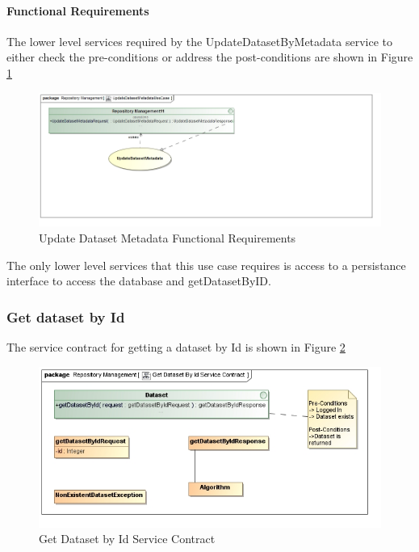 \paragraph{Functional Requirements}
The lower level services required by the UpdateDatasetByMetadata service to either check the
pre-conditions or address the post-conditions are shown in Figure \ref{fig:UpdateDatasetMetadataUseCase}
\begin{figure}[H]
	\begin{center}
		\includegraphics[scale=0.6]{../Diagrams and Charts/Test Data/UpdateDatasetMetadataUseCase.jpg}
		\caption{Update Dataset Metadata Functional Requirements}
		\label{fig:UpdateDatasetMetadataUseCase}
	\end{center}
\end{figure}

The only lower level services that this use case requires is access to
a persistance interface to access the database and getDatasetByID.
\subsubsection {Get dataset by Id}
The service contract for getting a dataset by Id is shown in Figure \ref{fig:getDatasetByIdService}
\begin{figure}[H]
  \begin{center}
  \includegraphics[scale=0.6]{../Diagrams and Charts/Test Data/Get Dataset By Id Service Contract.jpg}
  \caption{Get Dataset by Id Service Contract}
  \label{fig:getDatasetByIdService}
  \end{center}
  
\end{figure}

